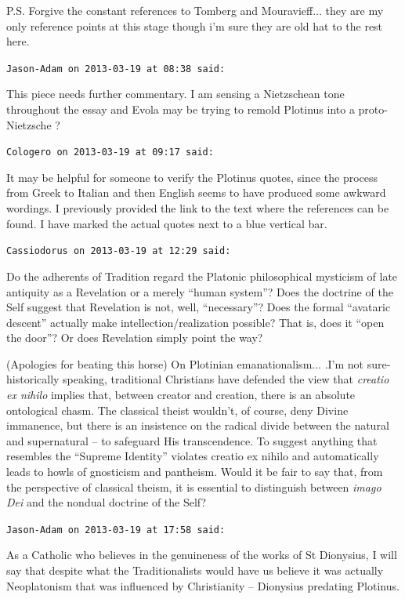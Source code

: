 \begin{footnotesize}
\begin{sffamily}
P.S. Forgive the constant references to Tomberg and Mouravieff... they are my only reference points at this stage though i'm sure they are old hat to the rest here.

\hfill

\texttt{Jason-Adam on 2013-03-19 at 08:38 said:}

This piece needs further commentary. I am sensing a Nietzschean tone throughout the essay and Evola may be trying to remold Plotinus into a proto-Nietzsche ?

\hfill

\texttt{Cologero on 2013-03-19 at 09:17 said:}

It may be helpful for someone to verify the Plotinus quotes, since the process from Greek to Italian and then English seems to have produced some awkward wordings. I previously provided the link to the text where the references can be found. I have marked the actual quotes next to a blue vertical bar.

\hfill

\texttt{Cassiodorus on 2013-03-19 at 12:29 said:}

Do the adherents of Tradition regard the Platonic philosophical mysticism of late antiquity as a Revelation or a merely ``human system''? Does the doctrine of the Self suggest that Revelation is not, well, ``necessary''? Does the formal ``avataric descent'' actually make intellection/realization possible? That is, does it ``open the door''? Or does Revelation simply point the way?

(Apologies for beating this horse) On Plotinian emanationalism... .I'm not sure- historically speaking, traditional Christians have defended the view that \emph{creatio ex nihilo} implies that, between creator and creation, there is an absolute ontological chasm. The classical theist wouldn't, of course, deny Divine immanence, but there is an insistence on the radical divide between the natural and supernatural -- to safeguard His transcendence. To suggest anything that resembles the ``Supreme Identity'' violates creatio ex nihilo and automatically leads to howls of gnosticism and pantheism. Would it be fair to say that, from the perspective of classical theism, it is essential to distinguish between \emph{imago Dei} and the nondual doctrine of the Self?

\hfill

\texttt{Jason-Adam on 2013-03-19 at 17:58 said:}

As a Catholic who believes in the genuineness of the works of St Dionysius, I will say that despite what the Traditionalists would have us believe it was actually Neoplatonism that was influenced by Christianity -- Dionysius predating Plotinus.


\end{sffamily}
\end{footnotesize}
